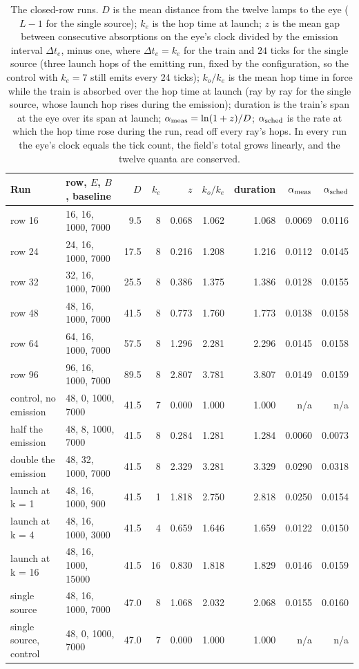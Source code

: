\documentclass[11pt]{article}
\begin{document}
\begin{table}[H]\centering\footnotesize\setlength{\tabcolsep}{3pt}
\begin{tabular}{p{2.9cm}p{2.9cm}rrrrrrr}
\toprule
Run & row, $E$, $B$, baseline & $D$ & $k_e$ & $z$ & $k_o/k_e$ & duration & $\alpha_{\rm meas}$ & $\alpha_{\rm sched}$\\
\midrule
row 16 & 16, 16, 1000, 7000 & 9.5 & 8 & 0.068 & 1.062 & 1.068 & 0.0069 & 0.0116\\
row 24 & 24, 16, 1000, 7000 & 17.5 & 8 & 0.216 & 1.208 & 1.216 & 0.0112 & 0.0145\\
row 32 & 32, 16, 1000, 7000 & 25.5 & 8 & 0.386 & 1.375 & 1.386 & 0.0128 & 0.0155\\
row 48 & 48, 16, 1000, 7000 & 41.5 & 8 & 0.773 & 1.760 & 1.773 & 0.0138 & 0.0158\\
row 64 & 64, 16, 1000, 7000 & 57.5 & 8 & 1.296 & 2.281 & 2.296 & 0.0145 & 0.0158\\
row 96 & 96, 16, 1000, 7000 & 89.5 & 8 & 2.807 & 3.781 & 3.807 & 0.0149 & 0.0159\\
control, no emission & 48, 0, 1000, 7000 & 41.5 & 7 & 0.000 & 1.000 & 1.000 & n/a & n/a\\
half the emission & 48, 8, 1000, 7000 & 41.5 & 8 & 0.284 & 1.281 & 1.284 & 0.0060 & 0.0073\\
double the emission & 48, 32, 1000, 7000 & 41.5 & 8 & 2.329 & 3.281 & 3.329 & 0.0290 & 0.0318\\
launch at k = 1 & 48, 16, 1000, 900 & 41.5 & 1 & 1.818 & 2.750 & 2.818 & 0.0250 & 0.0154\\
launch at k = 4 & 48, 16, 1000, 3000 & 41.5 & 4 & 0.659 & 1.646 & 1.659 & 0.0122 & 0.0150\\
launch at k = 16 & 48, 16, 1000, 15000 & 41.5 & 16 & 0.830 & 1.818 & 1.829 & 0.0146 & 0.0159\\
single source & 48, 16, 1000, 7000 & 47.0 & 8 & 1.068 & 2.032 & 2.068 & 0.0155 & 0.0160\\
single source, control & 48, 0, 1000, 7000 & 47.0 & 7 & 0.000 & 1.000 & 1.000 & n/a & n/a\\
\bottomrule
\end{tabular}
\caption{The closed-row runs. $D$ is the mean distance from the twelve lamps to the eye ($L - 1$ for the single source); $k_e$ is the hop time at launch; $z$ is the mean gap between consecutive absorptions on the eye's clock divided by the emission interval $\Delta t_e$, minus one, where $\Delta t_e = k_e$ for the train and $24$ ticks for the single source (three launch hops of the emitting run, fixed by the configuration, so the control with $k_e = 7$ still emits every 24 ticks); $k_o/k_e$ is the mean hop time in force while the train is absorbed over the hop time at launch (ray by ray for the single source, whose launch hop rises during the emission); duration is the train's span at the eye over its span at launch; $\alpha_{\rm meas} = \ln(1+z)/D$; $\alpha_{\rm sched}$ is the rate at which the hop time rose during the run, read off every ray's hops. In every run the eye's clock equals the tick count, the field's total grows linearly, and the twelve quanta are conserved.}
\label{tab:runs}
\end{table}
\end{document}

